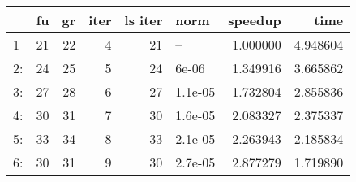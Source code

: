\begin{tabular}{lrrrrlrr}
\toprule
{} &  fu &  gr &  iter &  ls iter &     norm &   speedup &      time \\
\midrule
1  &  21 &  22 &     4 &       21 &       -- &  1.000000 &  4.948604 \\
2: &  24 &  25 &     5 &       24 &    6e-06 &  1.349916 &  3.665862 \\
3: &  27 &  28 &     6 &       27 &  1.1e-05 &  1.732804 &  2.855836 \\
4: &  30 &  31 &     7 &       30 &  1.6e-05 &  2.083327 &  2.375337 \\
5: &  33 &  34 &     8 &       33 &  2.1e-05 &  2.263943 &  2.185834 \\
6: &  30 &  31 &     9 &       30 &  2.7e-05 &  2.877279 &  1.719890 \\
\bottomrule
\end{tabular}
